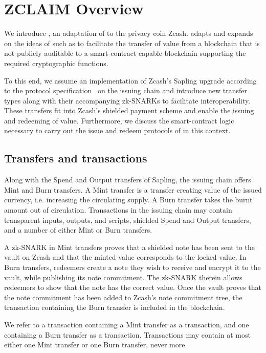 
\chapter{ZCLAIM Overview}

We introduce \zclaim, an adaptation of \xclaim to the privacy coin Zcash.
\zclaim adapts and expands on the ideas of \xclaim such as to facilitate the transfer of value from a blockchain that is not publicly auditable to a smart-contract capable blockchain supporting the required cryptographic functions.

To this end, we assume an implementation of Zcash's Sapling upgrade according to the protocol specification~\cite{hopwood2016zcash} on the issuing chain and introduce new transfer types along with their accompanying zk-SNARKs to facilitate interoperability.
These transfers fit into Zcash's shielded payment scheme and enable the issuing and redeeming of value.
Furthermore, we discuss the smart-contract logic necessary to carry out the issue and redeem protocols of \xclaim in this context.


\section{Transfers and transactions}

Along with the Spend and Output transfers of Sapling, the issuing chain offers Mint and Burn transfers.
A Mint transfer is a transfer creating value of the issued currency, i.e. increasing the circulating supply.
A Burn transfer takes the burnt amount out of circulation.
Transactions in the issuing chain may contain transparent inputs, outputs, and scripts, shielded Spend and Output transfers, and a number of either Mint or Burn transfers.

A zk-SNARK in Mint transfers proves that a shielded note has been sent to the vault on Zcash and that the minted value corresponds to the locked value.
In Burn transfers, redeemers create a note they wish to receive and encrypt it to the vault, while publishing its note commitment.
The zk-SNARK therein allows redeemers to show that the note has the correct value.
Once the vault proves that the note commitment has been added to Zcash's note commitment tree, the transaction containing the Burn transfer is included in the blockchain.

We refer to a transaction containing a Mint transfer as a \mint transaction, and one containing a Burn transfer as a \burn transaction.
Transactions may contain at most either one Mint transfer or one Burn transfer, never more.



